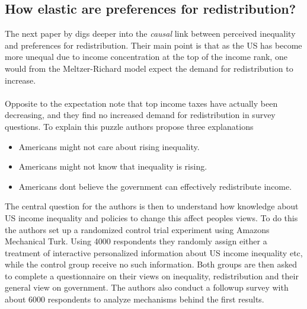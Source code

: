 \subsection{How elastic are preferences for redistribution? \citep{kuziemko_how_2015}}
The next paper by \citeauthor{kuziemko_how_2015} digs deeper into the \textit{causal} link between perceived inequality and preferences for redistribution. Their main point is that as the US has become more unequal due to income concentration at the top of the income rank, one would from the Meltzer-Richard model expect the demand for redistribution to increase. 
\\ \\
Opposite to the expectation \citeauthor{kuziemko_how_2015} note that top income taxes have actually been decreasing, and they find no increased demand for redistribution in survey questions. To explain this puzzle authors propose three explanations
\begin{itemize}
    \item Americans might not care about rising inequality. 
    \item Americans might not know that inequality is rising.
    \item Americans dont believe the government can effectively redistribute income.
\end{itemize}
The central question for the authors is then to understand how knowledge about US income inequality and policies to change this affect peoples views. To do this the authors set up a randomized control trial experiment using Amazons Mechanical Turk. Using 4000 respondents they randomly assign either a treatment of interactive personalized information about US income inequality etc, while the control group receive no such information. Both groups are then asked to complete a questionnaire on their views on inequality, redistribution and their general view on government. The authors also conduct a followup survey with about 6000 respondents to analyze mechanisms behind the first results. 

